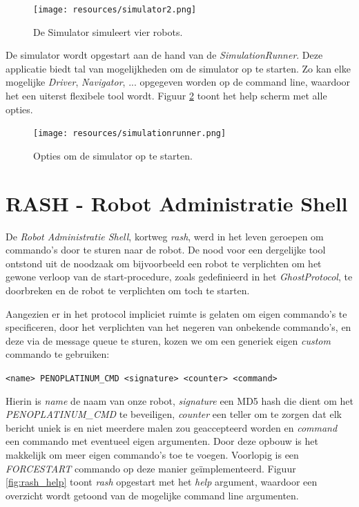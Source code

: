 \documentclass[12pt,a4paper]{report}
\begin{document}
\begin{figure}[htbp]
  \centering
  \texttt{[image: resources/simulator2.png]}
  \caption{De Simulator simuleert vier robots.}
  \label{fig:simulator2}
\end{figure}

De simulator wordt opgestart aan de hand van de \emph{SimulationRunner}. Deze applicatie biedt tal van mogelijkheden om de simulator op te starten. Zo kan elke mogelijke \emph{Driver}, \emph{Navigator}, ... opgegeven worden op de command line, waardoor het een uiterst flexibele tool wordt. Figuur \ref{fig:simulationrunner} toont het help scherm met alle opties.

\begin{figure}[htbp]
  \centering
  \texttt{[image: resources/simulationrunner.png]}
  \caption{Opties om de simulator op te starten.}
  \label{fig:simulationrunner}
\end{figure}

\section{RASH - Robot Administratie Shell}

De \emph{Robot Administratie Shell}, kortweg \emph{rash}, werd in het leven geroepen om commando's door te sturen naar de robot. De nood voor een dergelijke tool ontstond uit de noodzaak om bijvoorbeeld een robot te verplichten om het gewone verloop van de start-procedure, zoals gedefinieerd in het \emph{GhostProtocol}, te doorbreken en de robot te verplichten om toch te starten.

Aangezien er in het protocol impliciet ruimte is gelaten om eigen commando's te specificeren, door het verplichten van het negeren van onbekende commando's, en deze via de message queue te sturen, kozen we om een generiek eigen \emph{custom} commando te gebruiken:

\begin{center}
{\tt <name> PENOPLATINUM\_CMD <signature> <counter> <command>}
\end{center}

Hierin is \emph{name} de naam van onze robot, \emph{signature} een MD5 hash die dient om het \emph{PENOPLATINUM\_CMD} te beveiligen, \emph{counter} een teller om te zorgen dat elk bericht uniek is en niet meerdere malen zou geaccepteerd worden en \emph{command} een commando met eventueel eigen argumenten. Door deze opbouw is het makkelijk om meer eigen commando's toe te voegen. Voorlopig is een \emph{FORCESTART} commando op deze manier ge\"implementeerd. Figuur \ref{fig:rash_help} toont \emph{rash} opgestart met het \emph{help} argument, waardoor een overzicht wordt getoond van de mogelijke command line argumenten. 
\end{document}
